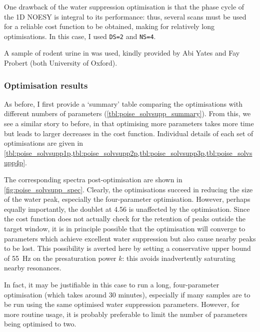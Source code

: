 One drawback of the water suppression optimisation is that the phase cycle of the 1D NOESY is integral to its performance: thus, several scans must be used for a reliable cost function to be obtained, making for relatively long optimisations.
In this case, I used \texttt{DS=2} and \texttt{NS=4}.

A sample of rodent urine in  was used, kindly provided by Abi Yates and Fay Probert (both University of Oxford).



\subsubsection{Optimisation results}

As before, I first provide a `summary' table comparing the optimisations with different numbers of parameters (\cref{tbl:poise_solvsupp_summary}).
From this, we see a similar story to before, in that optimising more parameters takes more time but leads to larger decreases in the cost function.
Individual details of each set of optimisations are given in \cref{tbl:poise_solvsupp1p,tbl:poise_solvsupp2p,tbl:poise_solvsupp3p,tbl:poise_solvsupp4p}.

The corresponding spectra post-optimisation are shown in \cref{fig:poise_solvsupp_spec}.
Clearly, the optimisations succeed in reducing the size of the water peak, especially the four-parameter optimisation.
However, perhaps equally importantly, the doublet at \SI{4.56}{\ppm} is unaffected by the optimisation.
Since the cost function does not actually check for the retention of peaks outside the target window, it is in principle possible that the optimisation will converge to parameters which achieve excellent water suppression but also cause nearby peaks to be lost.
This possibility is averted here by setting a conservative upper bound of \SI{55}{\Hz} on the presaturation power $k$: this avoids inadvertently saturating nearby resonances.

In fact, it may be justifiable in this case to run a long, four-parameter optimisation (which takes around 30 minutes), especially if many samples are to be run using the same optimised water suppression parameters.
However, for more routine usage, it is probably preferable to limit the number of parameters being optimised to two.


